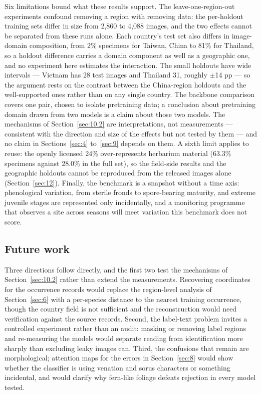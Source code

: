 \documentclass[preprint,12pt,authoryear]{elsarticle}
\begin{document}
Six limitations bound what these results support. The leave-one-region-out experiments confound removing a region with removing data: the per-holdout training sets differ in size from 2,860 to 4,088 images, and the two effects cannot be separated from these runs alone. Each country's test set also differs in image-domain composition, from 2\% specimens for Taiwan, China to 81\% for Thailand, so a holdout difference carries a domain component as well as a geographic one, and no experiment here estimates the interaction. The small holdouts have wide intervals --- Vietnam has 28 test images and Thailand 31, roughly $\pm$14 pp --- so the argument rests on the contrast between the China-region holdouts and the well-supported ones rather than on any single country. The backbone comparison covers one pair, chosen to isolate pretraining data; a conclusion about pretraining domain drawn from two models is a claim about those two models. The mechanisms of Section~\ref{sec:10.2} are interpretations, not measurements --- consistent with the direction and size of the effects but not tested by them --- and no claim in Sections~\ref{sec:4} to~\ref{sec:9} depends on them. A sixth limit applies to reuse: the openly licensed 24\% over-represents herbarium material (63.3\% specimens against 28.0\% in the full set), so the field-side results and the geographic holdouts cannot be reproduced from the released images alone (Section~\ref{sec:12}). Finally, the benchmark is a snapshot without a time axis: phenological variation, from sterile fronds to spore-bearing maturity, and extreme juvenile stages are represented only incidentally, and a monitoring programme that observes a site across seasons will meet variation this benchmark does not score.

\setcounter{section}{10}

\setcounter{subsection}{5}

\subsection{Future work}\label{sec:10.6}

Three directions follow directly, and the first two test the mechanisms of Section~\ref{sec:10.2} rather than extend the measurements. Recovering coordinates for the occurrence records would replace the region-level analysis of Section~\ref{sec:6} with a per-species distance to the nearest training occurrence, though the country field is not sufficient and the reconstruction would need verification against the source records. Second, the label-text problem invites a controlled experiment rather than an audit: masking or removing label regions and re-measuring the models would separate reading from identification more sharply than excluding leaky images can. Third, the confusions that remain are morphological; attention maps for the errors in Section~\ref{sec:8} would show whether the classifier is using venation and sorus characters or something incidental, and would clarify why fern-like foliage defeats rejection in every model tested.
\end{document}
